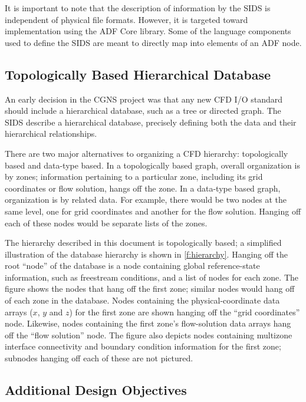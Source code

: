 It is important to note that the description of information by the
SIDS is independent of physical file formats.  However, it is targeted
toward implementation using the ADF Core library.  Some of the language
components used to define the SIDS are meant to directly map into
elements of an ADF node.

\subsection{Topologically Based Hierarchical Database}

An early decision in the CGNS project was that any new CFD I/O standard 
should include a hierarchical database, such as a tree or directed graph.
The SIDS describe a hierarchical database, precisely defining both the
data and their hierarchical relationships.

There are two major alternatives to organizing a CFD hierarchy:
topologically based and data-type based.  In a topologically based
graph, overall organization is by zones; information pertaining to a
particular zone, including its grid coordinates or flow solution, hangs
off the zone.  In a data-type based graph, organization is by related
data.  For example, there would be two nodes at the same level, one for
grid coordinates and another for the flow solution.  Hanging off each of
these nodes would be separate lists of the zones.



The hierarchy described in this document is topologically based;
a simplified illustration of the database hierarchy is shown in
\autoref{f:hierarchy}.  Hanging off the root ``node'' of the database is a
node containing global reference-state information, such as freestream
conditions, and a list of nodes for each zone.  The figure shows the
nodes that hang off the first zone; similar nodes would hang off of each
zone in the database.  Nodes containing the physical-coordinate data
arrays ($x$, $y$ and $z$) for the first zone are shown hanging off the
``grid coordinates'' node.  Likewise, nodes containing the first zone's
flow-solution data arrays hang off the ``flow solution'' node.  The figure
also depicts nodes containing multizone interface connectivity and
boundary condition information for the first zone; subnodes hanging off
each of these are not pictured.

\subsection{Additional Design Objectives}

